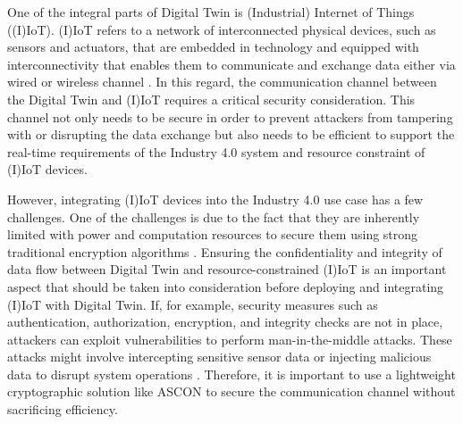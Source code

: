 One of the integral parts of Digital Twin is (Industrial) Internet of Things ((I)IoT). (I)IoT refers to a network of interconnected physical devices, such as sensors and actuators, that are embedded in technology and equipped with interconnectivity that enables them to communicate and exchange data either via wired or wireless channel \cite{maillet-contozEndtoendSecurityValidation2020}. In this regard, the communication channel between the Digital Twin and (I)IoT requires a critical security consideration. This channel not only needs to be secure in order to prevent attackers from tampering with or disrupting the data exchange but also needs to be efficient to support the real-time requirements of the Industry 4.0 system \cite{fuller_digital_2020} and resource constraint of (I)IoT devices. 


However, integrating (I)IoT devices into the Industry 4.0 use case has a few challenges. One of the challenges is due to the fact that they are inherently limited with power and computation resources to secure them using strong traditional encryption algorithms \cite{williams_survey_2022, noauthor_lightweight_nodate}. Ensuring the confidentiality and integrity of data flow between Digital Twin and resource-constrained (I)IoT is an important aspect that should be taken into consideration before deploying and integrating (I)IoT with Digital Twin. If, for example, security measures such as authentication, authorization, encryption, and integrity checks are not in place, attackers can exploit vulnerabilities to perform man-in-the-middle attacks. These attacks might involve intercepting sensitive sensor data or injecting malicious data to disrupt system operations \cite{salimBlockchainEnabledSecureDigital2022}. Therefore, it is important to use a lightweight cryptographic solution like ASCON to secure the communication channel without sacrificing efficiency. 






